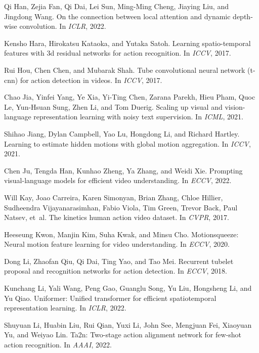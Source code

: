 \documentclass[10pt,twocolumn,letterpaper]{article}
\begin{document}
{\begin{thebibliography}{10}
Qi Han, Zejia Fan, Qi Dai, Lei Sun, Ming-Ming Cheng, Jiaying Liu, and Jingdong
  Wang.
\newblock On the connection between local attention and dynamic depth-wise
  convolution.
\newblock In {\em ICLR}, 2022.

Kensho Hara, Hirokatsu Kataoka, and Yutaka Satoh.
\newblock Learning spatio-temporal features with 3d residual networks for
  action recognition.
\newblock In {\em ICCV}, 2017.

Rui Hou, Chen Chen, and Mubarak Shah.
\newblock Tube convolutional neural network (t-cnn) for action detection in
  videos.
\newblock In {\em ICCV}, 2017.

Chao Jia, Yinfei Yang, Ye Xia, Yi-Ting Chen, Zarana Parekh, Hieu Pham, Quoc Le,
  Yun-Hsuan Sung, Zhen Li, and Tom Duerig.
\newblock Scaling up visual and vision-language representation learning with
  noisy text supervision.
\newblock In {\em ICML}, 2021.

Shihao Jiang, Dylan Campbell, Yao Lu, Hongdong Li, and Richard Hartley.
\newblock Learning to estimate hidden motions with global motion aggregation.
\newblock In {\em ICCV}, 2021.

Chen Ju, Tengda Han, Kunhao Zheng, Ya Zhang, and Weidi Xie.
\newblock Prompting visual-language models for efficient video understanding.
\newblock In {\em ECCV}, 2022.

Will Kay, Joao Carreira, Karen Simonyan, Brian Zhang, Chloe Hillier, Sudheendra
  Vijayanarasimhan, Fabio Viola, Tim Green, Trevor Back, Paul Natsev, et~al.
\newblock The kinetics human action video dataset.
\newblock In {\em CVPR}, 2017.

Heeseung Kwon, Manjin Kim, Suha Kwak, and Minsu Cho.
\newblock Motionsqueeze: Neural motion feature learning for video
  understanding.
\newblock In {\em ECCV}, 2020.

Dong Li, Zhaofan Qiu, Qi Dai, Ting Yao, and Tao Mei.
\newblock Recurrent tubelet proposal and recognition networks for action
  detection.
\newblock In {\em ECCV}, 2018.

Kunchang Li, Yali Wang, Peng Gao, Guanglu Song, Yu Liu, Hongsheng Li, and Yu
  Qiao.
\newblock Uniformer: Unified transformer for efficient spatiotemporal
  representation learning.
\newblock In {\em ICLR}, 2022.

Shuyuan Li, Huabin Liu, Rui Qian, Yuxi Li, John See, Mengjuan Fei, Xiaoyuan Yu,
  and Weiyao Lin.
\newblock Ta2n: Two-stage action alignment network for few-shot action
  recognition.
\newblock In {\em AAAI}, 2022.


\end{thebibliography}}
\end{document}
